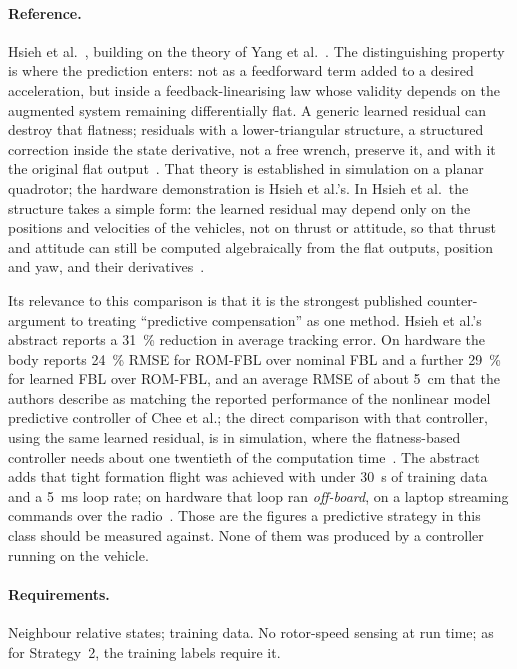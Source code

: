 \paragraph{Reference.} Hsieh et al.~\cite{hsieh2026flatness}, building on the theory of Yang et
al.~\cite{yang2025flatnessresiduals}. The distinguishing property is where the prediction enters:
not as a feedforward term added to a desired acceleration, but inside a feedback-linearising law
whose validity depends on the augmented system remaining differentially flat. A generic learned
residual can destroy that flatness; residuals with a lower-triangular structure, a structured
correction inside the state derivative, not a free wrench, preserve it, and with it the original
flat output~\cite{yang2025flatnessresiduals}. That theory is established in simulation on a planar
quadrotor; the hardware demonstration is Hsieh et al.'s.
In Hsieh et al.\ the structure takes a simple form: the learned residual may depend only on the
positions and velocities of the vehicles, not on thrust or attitude, so that thrust and attitude
can still be computed algebraically from the flat outputs, position and yaw, and their
derivatives~\cite{hsieh2026flatness}.

Its relevance to this comparison is that it is the strongest published counter-argument to treating
``predictive compensation'' as one method. Hsieh et al.'s abstract reports a \SI{31}{\percent}
reduction in average tracking error. On hardware the body reports \SI{24}{\percent} RMSE for
ROM-FBL over nominal FBL and a further \SI{29}{\percent} for learned FBL over ROM-FBL, and an
average RMSE of about \SI{5}{\centi\metre} that the authors describe as matching the reported
performance of the nonlinear model predictive controller of Chee et al.; the direct comparison with
that controller, using the same learned residual, is in simulation, where the flatness-based
controller needs about one twentieth of the computation time~\cite{hsieh2026flatness}. The abstract
adds that tight formation flight was achieved with under \SI{30}{\second} of training data and a
\SI{5}{\milli\second} loop rate; on hardware that loop ran \emph{off-board}, on a laptop streaming
commands over the radio~\cite{hsieh2026flatness}.
Those are the figures a predictive strategy in this class should be measured against. None of them
was produced by a controller running on the vehicle.

\paragraph{Requirements.} Neighbour relative states; training data. No rotor-speed sensing at run
time; as for Strategy~2, the training labels require it.

